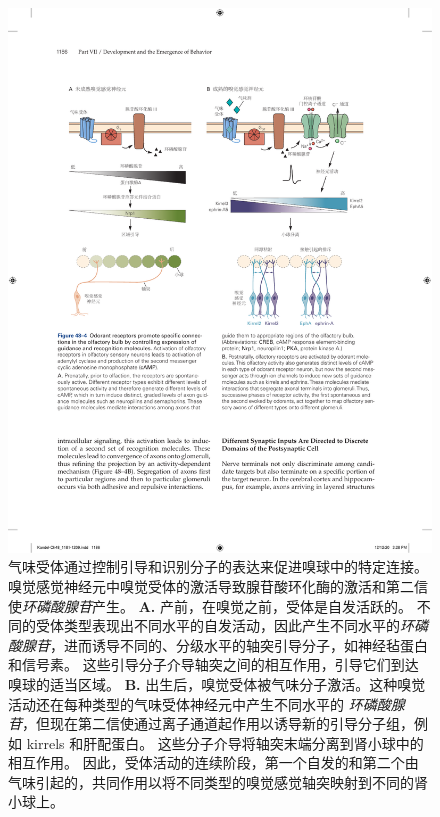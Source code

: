 \begin{figure}[htbp]
	\centering
	\includegraphics[width=1.0\linewidth]{chap48/fig_48_4}
	\caption{气味受体通过控制引导和识别分子的表达来促进嗅球中的特定连接。
		嗅觉感觉神经元中嗅觉受体的激活导致腺苷酸环化酶的激活和第二信使\textit{环磷酸腺苷}产生。
		\textbf{A.} 产前，在嗅觉之前，受体是自发活跃的。
		不同的受体类型表现出不同水平的自发活动，因此产生不同水平的\textit{环磷酸腺苷}，进而诱导不同的、分级水平的轴突引导分子，如神经毡蛋白和信号素。
		这些引导分子介导轴突之间的相互作用，引导它们到达嗅球的适当区域。
		\textbf{B.} 出生后，嗅觉受体被气味分子激活。这种嗅觉活动还在每种类型的气味受体神经元中产生不同水平的 \textit{环磷酸腺苷}，但现在第二信使通过离子通道起作用以诱导新的引导分子组，例如 kirrels 和肝配蛋白。
		这些分子介导将轴突末端分离到肾小球中的相互作用。
		因此，受体活动的连续阶段，第一个自发的和第二个由气味引起的，共同作用以将不同类型的嗅觉感觉轴突映射到不同的肾小球上。}
	\label{fig:48_4}
\end{figure}



